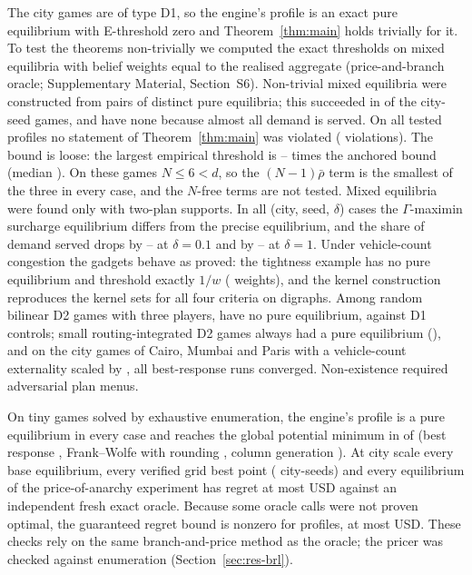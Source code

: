 \documentclass[preprint,11pt]{elsarticle}
\theoremstyle{definition}
\theoremstyle{remark}
\newcommand{\SM}[1]{Supplementary Material, Section~#1}
\begin{document}
The city games are of type D1, so the engine's profile is an exact pure equilibrium with E-threshold zero and Theorem~\ref{thm:main} holds trivially for it. To test the theorems non-trivially we computed the exact thresholds on mixed equilibria with belief weights equal to the realised aggregate (price-and-branch oracle; \SM{S6}). Non-trivial mixed equilibria were constructed from pairs of distinct pure equilibria; this succeeded in \ThGamesMixed{} of the \ThGamesTotal{} city-seed games, and \ThNoMixedCities{} have none because almost all demand is served. On all \ThProfiles{} tested profiles no statement of Theorem~\ref{thm:main} was violated (\ThViol{} violations). The bound is loose: the largest empirical threshold is \ThRatioMin--\ThRatioMax{} times the anchored bound (median \ThRatioMed). On these games $N\le6<d$, so the $(N-1)\bar\rho$ term is the smallest of the three in every case, and the $N$-free terms are not tested. Mixed equilibria were found only with two-plan supports. In all \ThGamCases{} (city, seed, $\delta$) cases the $\Gamma$-maximin surcharge equilibrium differs from the precise equilibrium, and the share of demand served drops by \ThGamDropLoMin--\ThGamDropLoMax{} at $\delta=0.1$ and by \ThGamDropHiMin--\ThGamDropHiMax{} at $\delta=1$. Under vehicle-count congestion the gadgets behave as proved: the tightness example has no pure equilibrium and threshold exactly $1/w$ (\ThPropOK{} weights), and the kernel construction reproduces the kernel sets for all four criteria on \ThKernOK{} digraphs. Among random bilinear D2 games with three players, \ThRandDtwo{} have no pure equilibrium, against \ThRandDone{} D1 controls; small routing-integrated D2 games always had a pure equilibrium (\ThTiny{}), and on the city games of Cairo, Mumbai and Paris with a vehicle-count externality scaled by \ThCityScales{}, all \ThCityRuns{} best-response runs converged. Non-existence required adversarial plan menus.

On \TinyN{} tiny games solved by exhaustive enumeration, the engine's profile is a pure equilibrium in every case and reaches the global potential minimum in \TinyZMCglobal{} of \TinyN{} (best response \TinyBRglobal, Frank--Wolfe with rounding \TinyFWglobal, column generation \TinyCGglobal). At city scale every base equilibrium, every verified grid best point (\VerBestN{} city-seeds) and every equilibrium of the price-of-anarchy experiment has regret at most \ExRegretFreshMax{} USD against an independent fresh exact oracle. Because some oracle calls were not proven optimal, the guaranteed regret bound is nonzero for \ExBoundN{} profiles, at most \ExBoundMax{} USD. These checks rely on the same branch-and-price method as the oracle; the pricer was checked against enumeration (Section~\ref{sec:res-brl}).
\end{document}

